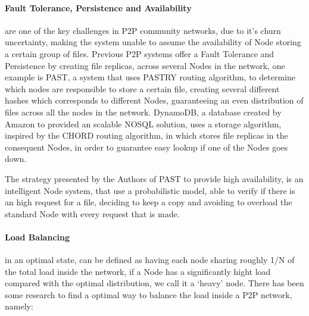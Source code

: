 \paragraph{\textbf{Fault Tolerance, Persistence and Availability}} %
\label{par:Fault Tolerance, Persistence and Availability}

are one of the key challenges in P2P community networks, due to it's churn uncertainty, making the system unable to assume the availability of Node storing a certain group of files. Previous P2P systems offer a Fault Tolerance and Persistence by creating file replicas, across several Nodes in the network, one example is PAST\cite{Druschel2001}\cite{Rowstron2001a}, a system that uses PASTRY routing algorithm, to determine which nodes are responsible to store a certain file, creating several different hashes which corresponds to different Nodes, guaranteeing an even distribution of files across all the nodes in the network. DynamoDB\cite{Decandia2007}, a database created by Amazon to provided an scalable NOSQL solution, uses a storage algorithm, inspired by the CHORD routing algorithm, in which stores file replicas in the consequent Nodes, in order to guarantee easy lookup if one of the Nodes goes down.

The strategy presented by the Authors of PAST to provide high availability, is an intelligent Node system, that use a probabilistic model, able to verify if there is an high request for a file, deciding to keep a copy and avoiding to overload the standard Node with every request that is made.


\paragraph{\textbf{Load Balancing}} %
\label{par:load_balancing}

in an optimal state, can be defined as having each node sharing roughly 1/N of the total load inside the network, if a Node has a significantly hight load compared with the optimal distribution, we call it a `heavy' node. There has been some research to find a optimal way to balance the load inside a P2P network, namely:

